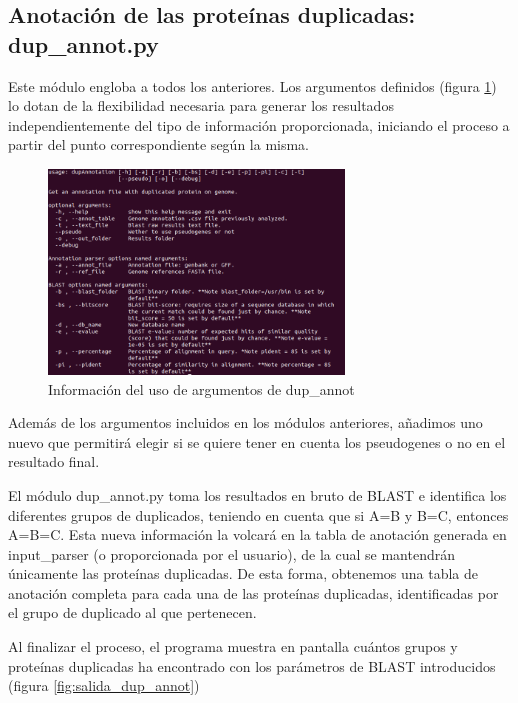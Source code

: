 \subsection{Anotación de las proteínas duplicadas: dup\_annot.py}
Este módulo engloba a todos los anteriores. Los argumentos definidos (figura \ref{fig:usage_dup_annot}) lo dotan de la flexibilidad necesaria para generar los resultados independientemente del tipo de información proporcionada, iniciando el proceso a partir del punto correspondiente según la misma.

\begin{figure}[h]
\centering
    \includegraphics[width=0.7\textwidth]{figs/usage_dup_annot.png}
    \caption[Información de dup\_annot en la terminal]{Información del uso de argumentos de dup\_annot}
    \label{fig:usage_dup_annot}
\end{figure}



Además de los argumentos incluidos en los módulos anteriores, añadimos uno nuevo que permitirá elegir si se quiere tener en cuenta los pseudogenes o no en el resultado final.

El módulo dup\_annot.py toma los resultados en bruto de BLAST e identifica los diferentes grupos de duplicados, teniendo en cuenta que si A=B y B=C, entonces A=B=C. Esta nueva información la volcará en la tabla de anotación generada en input\_parser (o proporcionada por el usuario), de la cual se mantendrán únicamente las proteínas duplicadas.  De esta forma, obtenemos una tabla de anotación completa para cada una de las proteínas duplicadas, identificadas por el grupo de duplicado al que pertenecen.

Al finalizar el proceso, el programa muestra en pantalla cuántos grupos y proteínas duplicadas ha encontrado con los parámetros de BLAST introducidos (figura \ref{fig:salida_dup_annot})


